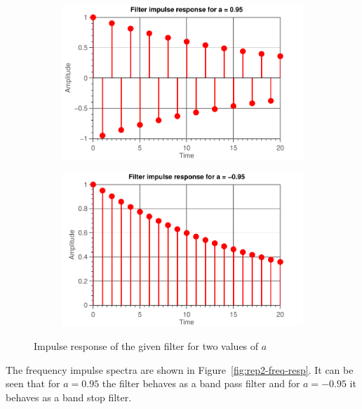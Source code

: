 \documentclass[11pt,titlepage]{report}
\begin{document}
\begin{figure}[H]
	\centering
	\begin{subfigure}{0.49\textwidth}
		\includegraphics[width=\textwidth]{resource/ass-1-report-2-a-positive.pdf}
	\end{subfigure}
	\begin{subfigure}{0.49\textwidth}
		\includegraphics[width=\textwidth]{resource/ass-1-report-2-a-negative.pdf}
	\end{subfigure}
	\caption{Impulse response of the given filter for two values of $a$}
	\label{fig:rep2-time-resp}
\end{figure}

The frequency impulse spectra are shown in Figure~\ref{fig:rep2-freq-resp}. It can be seen that for $a=0.95$ the filter behaves as a band pass filter and for $a=-0.95$ it behaves as a band stop filter. %
\end{document}
